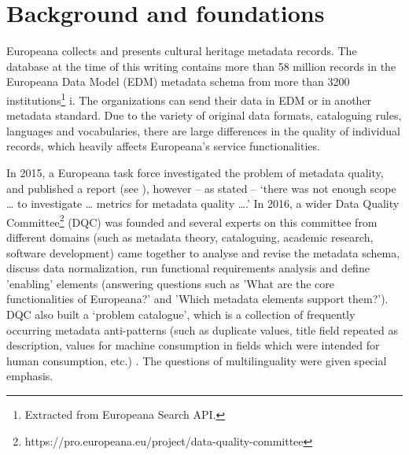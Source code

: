 \section{Background and foundations}

Europeana collects and presents cultural heritage metadata records. The database at the time of this writing contains more than 58 million records in the Europeana Data Model (EDM) metadata schema from more than 3200 institutions\footnote{Extracted from Europeana Search API.} i. The organizations can send their data in EDM or in another metadata standard. Due to the variety of original data formats, cataloguing rules, languages and vocabularies, there are large differences in the quality of individual records, which heavily affects Europeana's service functionalities.

In 2015, a Europeana task force investigated the problem of metadata quality, and published a report (see \cite{dangerfield2015}), however – as stated – `there was not enough scope … to investigate … metrics for metadata quality ….' In 2016, a wider Data Quality Committee\footnote{https://pro.europeana.eu/project/data-quality-committee} (DQC) was founded and several experts on this committee from different domains (such as metadata theory, cataloguing, academic research, software development) came together to analyse and revise the metadata schema, discuss data normalization, run functional requirements analysis and define 'enabling' elements (answering questions such as 'What are the core functionalities of Europeana?' and 'Which metadata elements support them?'). DQC also built a ‘problem catalogue’, which is a collection of frequently occurring metadata anti-patterns (such as duplicate values, title field repeated as description, values for machine consumption in fields which were intended for human consumption, etc.) \cite{hill-manguinhas2016}. The questions of multilinguality were given special emphasis.

